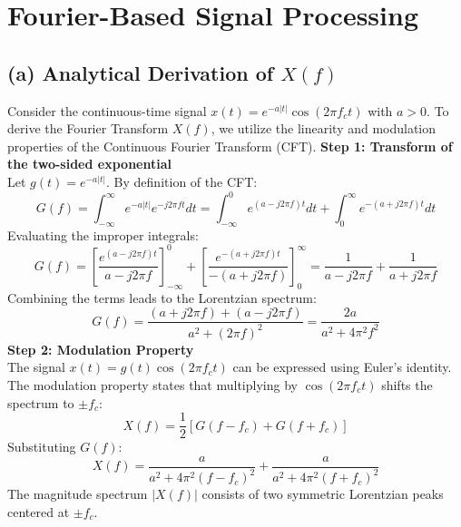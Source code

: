 \clearpage
\section{Fourier-Based Signal Processing}
\subsection*{(a) Analytical Derivation of $X(f)$}
Consider the continuous-time signal $x(t) = e^{-a|t|} \cos(2\pi f_c t)$ with $a > 0$. To
derive the Fourier Transform $X(f)$, we utilize the linearity and modulation properties
of the Continuous Fourier Transform (CFT).
\textbf{Step 1: Transform of the two-sided exponential} \\
Let $g(t) = e^{-a|t|}$. By definition of the CFT:
\begin{equation*}
G(f) = \int_{-\infty}^{\infty} e^{-a|t|} e^{-j2\pi ft} dt = \int_{-\infty}^{0} e^{(a - j2\pi f)t} dt +
\int_{0}^{\infty} e^{-(a + j2\pi f)t} dt
\end{equation*}
Evaluating the improper integrals:
\begin{equation*}
G(f) = \left[ \frac{e^{(a - j2\pi f)t}}{a - j2\pi f} \right]_{-\infty}^{0} + \left[ \frac{e^{-(a +
j2\pi f)t}}{-(a + j2\pi f)} \right]_{0}^{\infty} = \frac{1}{a - j2\pi f} + \frac{1}{a + j2\pi f}
\end{equation*}
Combining the terms leads to the Lorentzian spectrum:
\begin{equation*}
G(f) = \frac{(a + j2\pi f) + (a - j2\pi f)}{a^2 + (2\pi f)^2} = \frac{2a}{a^2 + 4\pi^2 f^2}
\end{equation*}
\textbf{Step 2: Modulation Property} \\
The signal $x(t) = g(t) \cos(2\pi f_c t)$ can be expressed using Euler's identity. The
modulation property states that multiplying by $\cos(2\pi f_c t)$ shifts the spectrum to
$\pm f_c$:
\begin{equation*}
X(f) = \frac{1}{2} [G(f - f_c) + G(f + f_c)]
\end{equation*}
Substituting $G(f)$:
\begin{equation*}
X(f) = \frac{a}{a^2 + 4\pi^2 (f - f_c)^2} + \frac{a}{a^2 + 4\pi^2 (f + f_c)^2}
\end{equation*}
The magnitude spectrum $|X(f)|$ consists of two symmetric Lorentzian peaks
centered at $\pm f_c$.
